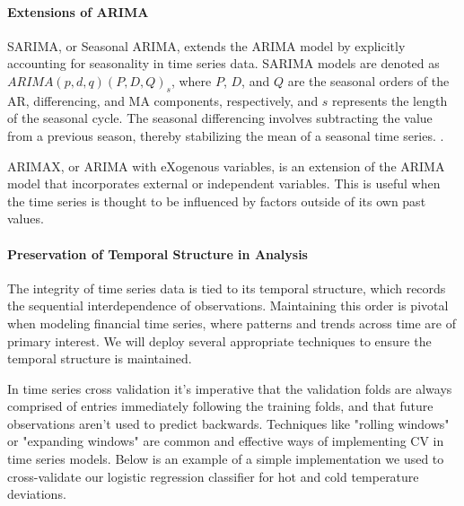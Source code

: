 \documentclass[12pt, twoside,hidelinks]{article}
\theoremstyle{definition}
\numberwithin{equation}{section}
\begin{document}
\paragraph{Extensions of ARIMA}

SARIMA, or Seasonal ARIMA, extends the ARIMA model by explicitly accounting for seasonality in time series data. SARIMA models are denoted as \(ARIMA(p,d,q)(P,D,Q)_s\), where \(P\), \(D\), and \(Q\) are the seasonal orders of the AR, differencing, and MA components, respectively, and \(s\) represents the length of the seasonal cycle.
The seasonal differencing involves subtracting the value from a previous season, thereby stabilizing the mean of a seasonal time series. .

ARIMAX, or ARIMA with eXogenous variables, is an extension of the ARIMA model that incorporates external or independent variables. This is useful when the time series is thought to be influenced by factors outside of its own past values. 

\paragraph{Preservation of Temporal Structure in Analysis}
The integrity of time series data is tied to its temporal structure, which records the sequential interdependence of observations. Maintaining this order is pivotal when modeling financial time series, where patterns and trends across time are of primary interest. We will deploy several appropriate techniques to ensure the temporal structure is maintained.
\newline

In time series cross validation it's imperative that the validation folds are always comprised of entries immediately following the training folds, and that future observations aren't used to predict backwards. Techniques like "rolling windows" or "expanding windows" are common and effective ways of implementing CV in time series models. Below is an example of a simple implementation we used to cross-validate our logistic regression classifier for hot and cold temperature deviations. 
\end{document}
